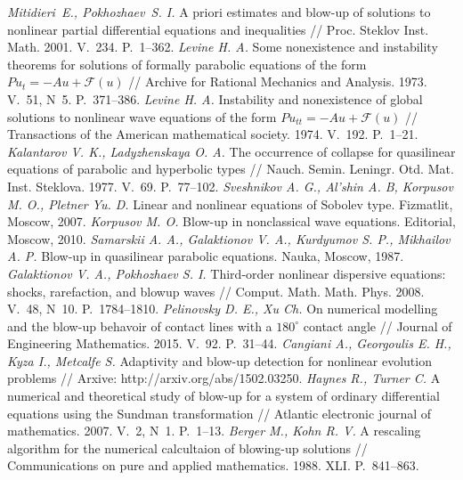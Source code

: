 \documentclass[twoside]{book}
\begin{document}
\begin{CJK*}{GBK}{song}
\begin{thebibliography}{s2}
      {\itshape Mitidieri~E., Pokhozhaev~S. I.} A priori estimates and blow-up of solutions to nonlinear partial differential equations and inequalities // Proc. Steklov Inst. Math. 2001. V.~234. P.~1--362.
     {\itshape Levine H. A.} Some nonexistence and instability theorems for solutions of formally parabolic equations of the form $Pu_t=-Au+\mathcal{F}(u)$ // Archive for Rational Mechanics and Analysis. 1973. V.~51, N~5. P.~371--386.
     {\itshape Levine H. A.}  Instability and nonexistence of global solutions to nonlinear wave equations of the form $Pu_{tt}=-Au+\mathcal{F}(u)$ // Transactions of the American mathematical society. 1974. V.~192. P.~1--21.
     {\itshape Kalantarov V. K., Ladyzhenskaya O. A.} The occurrence of collapse for quasilinear equations of parabolic and hyperbolic types // Nauch. Semin. Leningr. Otd. Mat. Inst. Steklova. 1977. V.~69. P.~77--102.
     {\itshape Sveshnikov A. G., Al’shin A. B, Korpusov M. O., Pletner Yu. D.}  Linear and nonlinear equations of Sobolev type.  Fizmatlit, Moscow, 2007.
     {\itshape Korpusov M. O.} Blow-up in nonclassical wave equations. Editorial, Moscow, 2010.
     {\itshape Samarskii A. A., Galaktionov V. A., Kurdyumov S. P., Mikhailov A. P.} Blow-up in quasilinear parabolic equations. Nauka, Moscow, 1987.
     {\itshape Galaktionov V. A., Pokhozhaev S. I.} Third-order nonlinear dispersive equations: shocks, rarefaction, and blowup waves // Comput. Math. Math. Phys. 2008. V.~48, N~10. P.~1784--1810.
     {\itshape Pelinovsky D. E., Xu Ch.} On numerical modelling and the blow-up behavoir of contact lines with a $180^\circ$ contact angle // Journal of Engineering Mathematics. 2015. V.~92. P.~31--44.
     {\itshape Cangiani A., Georgoulis E. H., Kyza I., Metcalfe S.} Adaptivity and blow-up detection for nonlinear evolution problems // Arxive: http://arxiv.org/abs/1502.03250.
     {\itshape Haynes R., Turner C.} A numerical and theoretical study of blow-up for a system of ordinary differential equations using the Sundman transformation // Atlantic electronic journal of mathematics. 2007. V.~2, N~1. P.~1--13.
     {\itshape Berger M., Kohn R. V.} A rescaling algorithm for the numerical calcultaion of blowing-up solutions // Communications on pure and applied mathematics. 1988. XLI. P.~841--863.

\end{thebibliography}
\end{CJK*}
\end{document}
